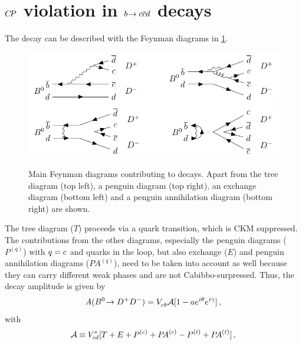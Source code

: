 
\section{\texorpdfstring{${C\!P}$}{CP} violation in \texorpdfstring{${b}\!\rightarrow {\ensuremath{c}}{\ensuremath{\overline {{c}}}}{\ensuremath{d}}$}{bToccbard} decays}
\label{sec:cpviolation:btoccbard}

The decay \BdToDD can be described with the Feynman diagrams in
\cref{fig:cpviolation:feynmandiagrams_bdtodd}.
\begin{figure}[htb]
\centering
\includegraphics[width=\textwidth]{03-CPViolation/tikz/pdf/BdToDD_Feynmans.pdf}
\includegraphics[width=\textwidth]{03-CPViolation/tikz/pdf/BdToDD_Feynmans2.pdf}
\caption{Main Feynman diagrams contributing to \BdToDD decays. Apart from the
tree diagram (top left), a penguin diagram (top right), an exchange diagram
(bottom left) and a penguin annihilation diagram (bottom right) are shown.}
\label{fig:cpviolation:feynmandiagrams_bdtodd}
\end{figure}
The tree diagram ($T$) proceeds via a \bToccbard quark transition, which is
CKM suppressed. The contributions from the other diagrams, especially the
penguin diagrams ($P^{(q)}$) with $q = {c}$ and \tquark quarks in the
loop, but also exchange ($E$) and penguin annihilation diagrams
($P\!A^{(q)}$), need to be taken into account as well because they can carry
different weak phases and are not Cabibbo-surpressed. Thus, the decay
amplitude is given by~\cite{Fleischer1999,Fleischer2007,Bel:2015wha}
\begin{align}
	A({{B}^0}\!\rightarrow {\ensuremath{{D}^+}}{\ensuremath{{D}^-}}) = {V_{{c}{b}}^{}} \mathcal{A}[1 - ae^{i\theta}e^{i\gamma}]\,,
\end{align}
with
\begin{align}
	\mathcal{A} \equiv {\ensuremath{V_{{c}{d}}^\ast}}[T + E + {P^{(c)} + P\!A^{(c)}} - {P^{(t)} + P\!A^{(t)}}]\,,
\end{align}
